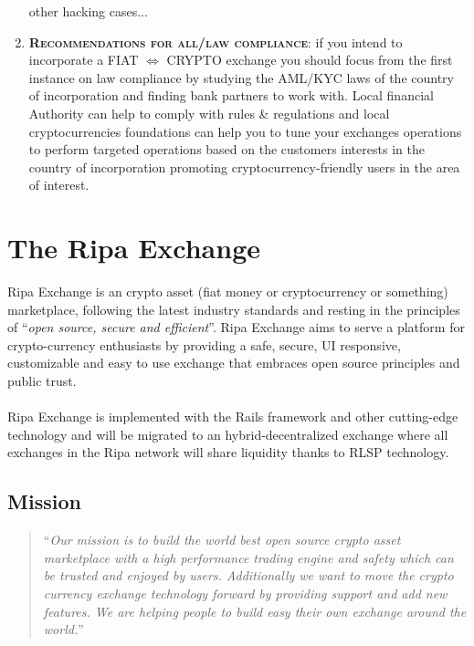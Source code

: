 \documentclass[11pt,fleqn]{book} %
\begin{document}
\begin{enumerate}
	other hacking cases...
	\item \textbf{\textsc{Recommendations for all/law compliance}}: if you intend to incorporate a FIAT $\Leftrightarrow$ CRYPTO 
	exchange you should
	focus from the first instance on law compliance by studying the AML/KYC laws of the country of incorporation and
	finding bank partners to work with. Local financial Authority can help to comply with rules \& regulations and 
	local cryptocurrencies foundations can help you to tune your exchanges operations to perform targeted
	operations based on the customers interests in the country of incorporation promoting cryptocurrency-friendly 
	users in the area of interest.
\end{enumerate}




\chapter{The Ripa Exchange}
Ripa Exchange is an crypto asset (fiat money or cryptocurrency or something) marketplace, following the latest 
industry standards and resting in the principles of ``\textit{open source, secure and efficient}''. Ripa Exchange
aims to serve a platform for crypto-currency enthusiasts by providing a safe, secure, UI responsive, customizable 
and easy to use exchange that embraces open source principles and public trust.\\\\
Ripa Exchange is implemented with the Rails framework and other cutting-edge technology and will be migrated to an
hybrid-decentralized exchange where all exchanges in the Ripa network will share liquidity thanks to RLSP technology.

\section{Mission}
\begin{quotation}
	``\textit{Our mission is to build the world best open source crypto asset marketplace with a high performance trading engine 
	and safety which can be trusted and enjoyed by users. Additionally we want to move the crypto currency exchange technology 
	forward by providing support and add new features. We are helping people to build easy their own exchange around the world.}''
\end{quotation}
\end{document}
